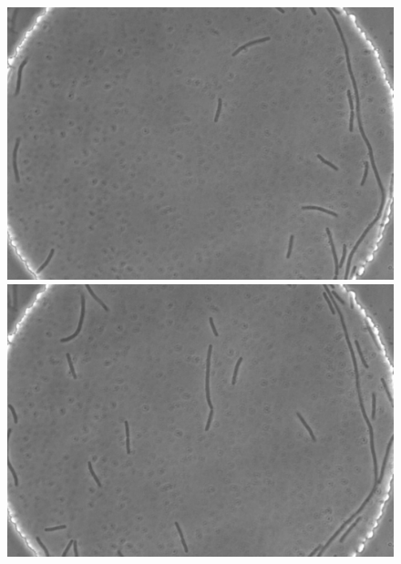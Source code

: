 \documentclass[a4paper,11pt]{jsarticle}
\begin{document}
\title{}
\author{}
\date{\today}
\maketitle

\begin{figure}[htbp]
  \centering
  \begin{minipage}{0.45\linewidth}
    \centering
    \includegraphics[width=\columnwidth]{Series015_t000000_RAW_ch00.pdf}
    \caption{}
    \label{fig:1}
  \end{minipage}
  \begin{minipage}{0.45\linewidth}
    \centering
    \includegraphics[width=\columnwidth]{Series015_t010000_RAW_ch00.pdf}
    \caption{}
    \label{fig:2}
  \end{minipage}
  \begin{minipage}{0.45\linewidth}

\end{minipage}
\end{figure}
\end{document}
